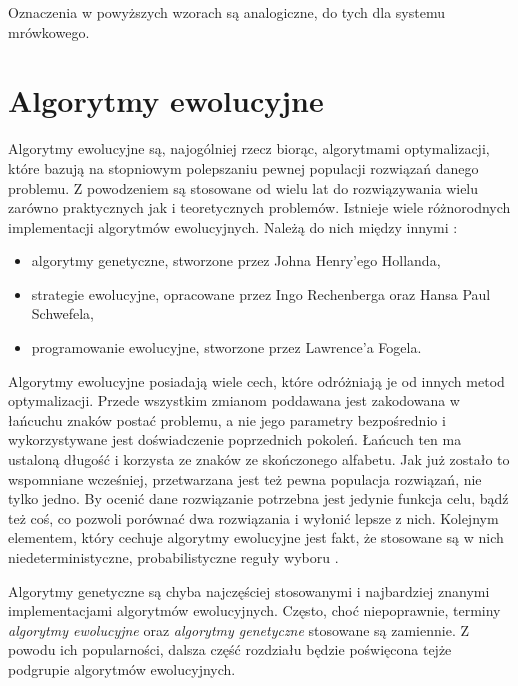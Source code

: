 Oznaczenia w powyższych wzorach są analogiczne, do tych dla systemu mrówkowego.
\section{Algorytmy ewolucyjne}
\label{sec:AE}

Algorytmy ewolucyjne są, najogólniej rzecz biorąc, algorytmami optymalizacji, które bazują na stopniowym polepszaniu pewnej populacji rozwiązań danego problemu. Z powodzeniem są stosowane od wielu lat do rozwiązywania wielu zarówno praktycznych jak i teoretycznych problemów. Istnieje wiele różnorodnych implementacji algorytmów ewolucyjnych. Należą do nich między innymi \cite{APROX_JONES}:
\begin{itemize}
\item algorytmy genetyczne, stworzone przez Johna Henry'ego Hollanda,
\item strategie ewolucyjne, opracowane przez Ingo Rechenberga oraz Hansa Paul Schwefela,
\item programowanie ewolucyjne, stworzone przez Lawrence'a Fogela.
\end{itemize}

Algorytmy ewolucyjne posiadają wiele cech, które odróżniają je od innych metod optymalizacji. Przede wszystkim zmianom poddawana jest zakodowana w łańcuchu znaków postać problemu, a nie jego parametry bezpośrednio i wykorzystywane jest doświadczenie poprzednich pokoleń. Łańcuch ten ma ustaloną długość i korzysta ze znaków ze skończonego alfabetu. Jak już zostało to wspomniane wcześniej, przetwarzana jest też pewna populacja rozwiązań, nie tylko jedno. By ocenić dane rozwiązanie potrzebna jest jedynie funkcja celu, bądź też coś, co pozwoli porównać dwa rozwiązania i wyłonić lepsze z nich. Kolejnym elementem, który cechuje algorytmy ewolucyjne jest fakt, że stosowane są w nich niedeterministyczne, probabilistyczne reguły wyboru \cite{AE_GWIAZDA}.

Algorytmy genetyczne są chyba najczęściej stosowanymi i najbardziej znanymi implementacjami algorytmów ewolucyjnych. Często, choć niepoprawnie, terminy \textit{algorytmy ewolucyjne} oraz \textit{algorytmy genetyczne} stosowane są zamiennie. Z powodu ich popularności, dalsza część rozdziału będzie poświęcona tejże podgrupie algorytmów ewolucyjnych.

